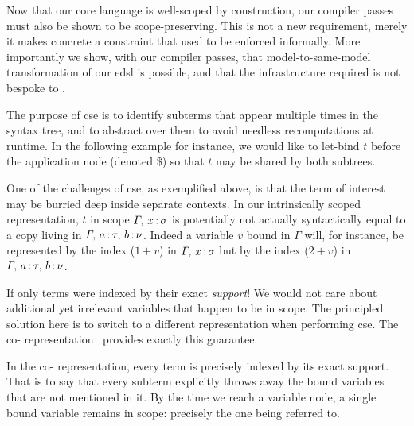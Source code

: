 
Now that our core language is well-scoped by construction, our compiler passes must also be shown to be scope-preserving.
%
This is not a new requirement, merely it makes concrete a constraint that used to be enforced informally.
%
More importantly we show, with our compiler passes, that model-to-same-model transformation of our \ac{edsl} is possible, and that the infrastructure required is not bespoke to \Velo{}.

The purpose of \ac{cse} is to identify subterms that appear multiple times in the syntax tree, and to abstract over them to avoid needless recomputations at runtime.
%
In the following example for instance, we would like to let-bind $t$ before the application node (denoted \$) so that $t$ may be shared by both subtrees.

\begin{center}
  \cseexamplegraph{}
\end{center}

One of the challenges of \ac{cse}, as exemplified above, is that the term of interest may be burried deep inside separate contexts.
%
In our intrinsically scoped representation, $t$ in scope
$\Gamma,\, x\,\mathord{:}\,\sigma$ is potentially not actually
syntactically equal to a copy living in $\Gamma,\, a\,\mathord{:}\,\tau,\, b\,\mathord{:}\,\nu$.
%
Indeed a variable $v$ bound in $\Gamma$ will, for instance, be
represented by the \DeBruijn{} index ($1+v$) in $\Gamma,\, x\,\mathord{:}\,\sigma$
but by the index ($2+v$) in $\Gamma,\, a\,\mathord{:}\,\tau,\, b\,\mathord{:}\,\nu$.

If only terms were indexed by their exact \emph{support}!
%
We would not care about additional yet irrelevant variables that happen to be in scope.
%
The principled solution here is to switch to a different representation when performing \ac{cse}.
%
The co-\DeBruijn{} representation~\cite{DBLP:journals/corr/abs-1807-04085} provides exactly this guarantee.


In the co-\DeBruijn{} representation, every term is precisely indexed by its exact support.
%
That is to say that every subterm explicitly throws away the bound variables that are not mentioned in it.
%
By the time we reach a variable node, a single bound variable remains in scope:
%
precisely the one being referred to.

